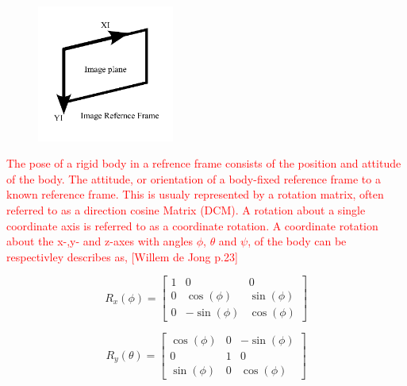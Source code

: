 
\begin{figure}[H]
    \centering
    \includegraphics[width=0.4\textwidth]{figures/modelling/MRF.pdf}
    \caption{}
    \label{fig:MRF}
\end{figure}








\label{sec:modrigid}

\label{sec:kinematics}

\textcolor{red}{The pose of a rigid body in a refrence frame consists of the position and attitude of the body. The attitude, or orientation of a body-fixed reference frame to a
known reference frame. This is usualy represented by a rotation matrix, often referred to as a direction cosine Matrix (DCM). A rotation about a single coordinate axis
is referred to as a coordinate rotation. A coordinate rotation about the x-,y- and z-axes with angles $\phi$, $\theta$ and $\psi$, of the body can be respectivley
describes as, [Willem de Jong p.23]}

\begin{equation}
    R_x(\phi) = \begin{bmatrix} 
        1 & 0 & 0 \\
        0 & \cos(\phi) & \sin(\phi) \\
        0 & -\sin(\phi) & \cos(\phi)
    \end{bmatrix}
    \label{Eq:3.1}
\end{equation}

\begin{equation}
    R_y(\theta) = \begin{bmatrix} 
        \cos(\phi) & 0 & -\sin(\phi) \\
        0 & 1 & 0 \\
        \sin(\phi) & 0  & \cos(\phi)
    \end{bmatrix}
    \label{Eq:3.2}
\end{equation}

